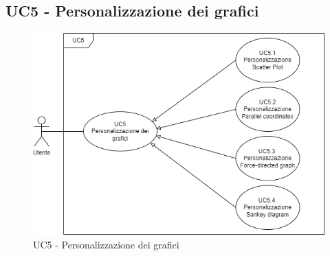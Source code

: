 \newpage


\subsection{UC5 - Personalizzazione dei grafici}
\begin{figure}[h!]
	\centering
	\includegraphics[scale=0.60]{../../assets/personalizzazioneVisivaGrafici.png}
	\caption{UC5 - Personalizzazione dei grafici}
\end{figure}
